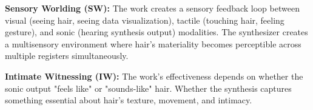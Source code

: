 \textbf{Sensory Worlding (SW):} The work creates a sensory feedback loop between visual (seeing hair, seeing data visualization), tactile (touching hair, feeling gesture), and sonic (hearing synthesis output) modalities. The synthesizer creates a multisensory environment where hair's materiality becomes perceptible across multiple registers simultaneously.

\textbf{Intimate Witnessing (IW):} The work's effectiveness depends on whether the sonic output "feels like" or "sounds-like" hair. Whether the synthesis captures something essential about hair's texture, movement, and intimacy.